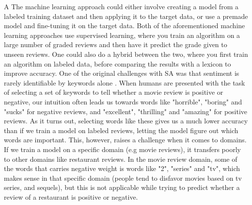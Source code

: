\documentclass{report}
\begin{document}
A 
The machine learning approach could either involve creating a model from a labeled training dataset and then applying it to the target data, or use a premade model and fine-tuning it on the target data. Both of the aforementioned machine learning approaches use supervised learning, where you train an algorithm on a large number of graded reviews and then have it predict the grade given to unseen reviews. One could also do a hybrid between the two, where you first train an algorithm on labeled data, before comparing the results with a lexicon to improve accuracy.
One of the original challenges with SA was that sentiment is rarely identifiable by keywords alone \cite{pang-etal-2002-thumbs}. When humans are presented with the task of selecting a set of keywords to tell whether a movie review is positive or negative, our intuition often leads us towards words like "horrible", "boring" and "sucks" for negative reviews, and "excellent", "thrilling" and "amazing" for positive reviews. As it turns out, selecting words like these gives us a much lower accuracy than if we train a model on labeled reviews, letting the model figure out which words are important. This, however, raises a challenge when it comes to domains. If we train a model on a specific domain (e.g movie reviews), it transfers poorly to other domains like restaurant reviews. In the movie review domain, some of the words that carries negative weight is words like "2", "series" and "tv", which makes sense in that specific domain (people tend to disfavor movies based on tv series, and sequels), but this is not applicable while trying to predict whether a review of a restaurant is positive or negative. 





\end{document}
